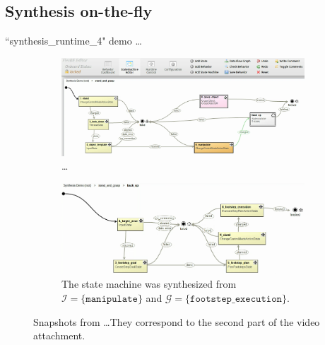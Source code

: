 \subsection{Synthesis on-the-fly}

``synthesis\_runtime\_4" demo \ldots

\begin{figure}[t]
	\centering
	\begin{subfigure}[b]{0.99\columnwidth}
	\includegraphics[width=0.99\columnwidth, clip]{./img/synthesis_runtime_connect_sm.png}
	\caption{\ldots
	} 
	\label{Fig:runtime1}
	\end{subfigure}
	
	\vspace{4 pt}
	\begin{subfigure}[b]{0.99\columnwidth}
	\includegraphics[width=0.99\columnwidth, clip]{./img/synthesis_runtime_synthesized_sm.png}
	\caption{The state machine was synthesized from $\mathcal{I} = \{ \mathtt{manipulate} \}$ and $\mathcal{G} = \{ \mathtt{footstep\_execution} \}$.
	} 
	\label{Fig:runtime2}
	\end{subfigure}
	\caption{Snapshots from \ldots They correspond to the second part of the video attachment.
	}
	\label{Fig:synthesis_runtime_demo}
\end{figure}

